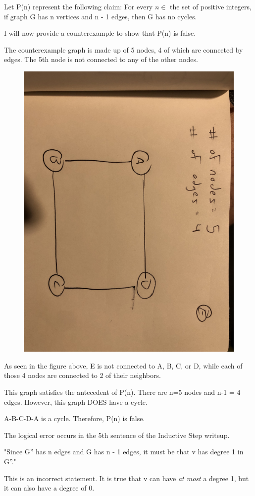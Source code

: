 \documentclass{6042}
\author{Ian Miller}
\begin{document}


Let P(n) represent the following claim: For every $n \in$ the set of positive integers, if graph G has n vertices and n - 1 edges, then G has no cycles.

I will now provide a counterexample to show that P(n) is false.

The counterexample graph is made up of 5 nodes, 4 of which are connected by edges. The 5th node is not connected to any of the other nodes.

\begin{figure}[h!]
    \includegraphics[width=0.6\linewidth]{prob1graph.jpg}

\end{figure}

As seen in the figure above, E is not connected to A, B, C, or D, while each of those 4 nodes are connected to 2 of their neighbors.

This graph satisfies the antecedent of P(n). There are n=5 nodes and n-1 = 4 edges. 
However, this graph DOES have a cycle. 

A-B-C-D-A is a cycle. Therefore, P(n) is false.


The logical error occurs in the 5th sentence of the Inductive Step writeup.

"Since G'' has n edges and G has n - 1 edges, it must be that v has degree 1 in G''."

This is an incorrect statement. It is true that v can have \textit{at most} a degree 1, but it can also have a degree of 0.
\end{document}
